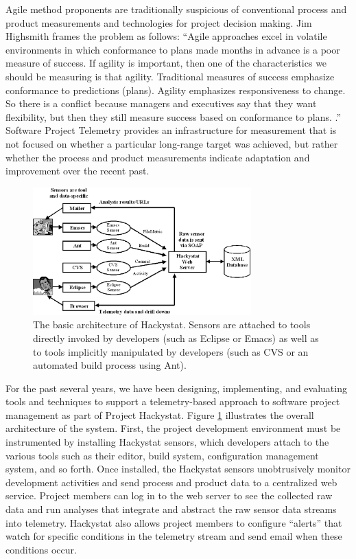 \documentclass[11pt,twocolumn]{article}
\begin{document}
Agile method proponents are traditionally suspicious of conventional
process and product measurements and technologies for project decision
making. Jim Highsmith frames the problem as follows: ``Agile approaches
excel in volatile environments in which conformance to plans made months in
advance is a poor measure of success. If agility is important, then one of
the characteristics we should be measuring is that agility. Traditional
measures of success emphasize conformance to predictions (plans). Agility
emphasizes responsiveness to change. So there is a conflict because
managers and executives say that they want flexibility, but then they still
measure success based on conformance to plans. \cite{Highsmith02}.''
Software Project Telemetry provides an infrastructure for measurement that
is not focused on whether a particular long-range target was achieved, but
rather whether the process and product measurements indicate adaptation and
improvement over the recent past. 


\begin{figure}[ht]
  \centering
  \includegraphics[width=0.75\textwidth]{architecture.eps}
  \caption{The basic architecture of Hackystat. Sensors are attached to
  tools directly invoked by developers (such as Eclipse or Emacs) as
  well as to tools implicitly manipulated by developers (such as CVS or 
  an automated build process using Ant).}
  \label{fig:architecture}
\end{figure}


For the past several years, we have been designing, implementing, and
evaluating tools and techniques to support a telemetry-based approach to
software project management as part of Project Hackystat.  Figure
\ref{fig:architecture} illustrates the overall architecture of the
system. First, the project development environment must be instrumented by
installing Hackystat sensors, which developers attach to the various tools
such as their editor, build system, configuration management system, and so
forth. Once installed, the Hackystat sensors unobtrusively monitor
development activities and send process and product data to a centralized
web service.  Project members can log in to the web server to see the
collected raw data and run analyses that integrate and abstract the raw
sensor data streams into telemetry.  Hackystat also allows project members
to configure ``alerts'' that watch for specific conditions in the
telemetry stream and send email when these conditions occur.  
\end{document}
